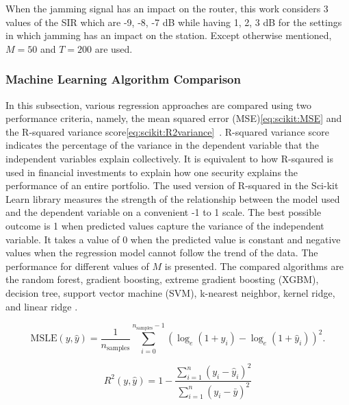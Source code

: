When the jamming signal has an impact on the router, this work considers 3 values of the SIR which are -9, -8, -7 dB while having 1, 2, 3 dB for the settings in which jamming has an impact on the station. Except otherwise mentioned, $M = 50$ and $T = 200$ are used. 

\subsubsection{Machine Learning Algorithm Comparison}
In this subsection, various regression approaches are compared using two performance criteria, namely, the mean squared error (MSE)\eqref{eq:scikit:MSE} and the R-squared variance score\eqref{eq:scikit:R2variance}~\cite{r-squared}. R-squared variance score indicates the percentage of the variance in the dependent variable that the independent variables explain collectively.  It is equivalent to how R-sqaured is used in financial investments to explain how one security explains the performance of an entire portfolio. The used version of R-squared in the Sci-kit Learn library measures the strength of the relationship between the model used and the dependent variable on a convenient -1 to 1 scale.  The best possible outcome is 1 when predicted values capture the variance of the independent variable. It takes a value of 0 when the predicted value is constant and negative values when the regression model cannot follow the trend of the data. The performance for different values of $M$ is presented. The compared algorithms are the random forest, gradient boosting, extreme gradient boosting (XGBM), decision tree, support vector machine (SVM), k-nearest neighbor, kernel ridge, and linear ridge \cite{SCIKITLEARN,Chen:2016:XST:2939672.2939785}. %

\begin{equation}
\text{MSLE}(y, \hat{y}) = \frac{1}{n_\text{samples}} \sum_{i=0}^{n_\text{samples} - 1} (\log_e (1 + y_i) - \log_e (1 + \hat{y}_i) )^2.
\label{eq:scikit:MSE}
\end{equation}

\begin{equation}
R^2(y, \hat{y}) = 1 - \frac{\sum_{i=1}^{n} (y_i - \hat{y}_i)^2}{\sum_{i=1}^{n} (y_i - \bar{y})^2}
\label{eq:scikit:R2variance}
\end{equation}

